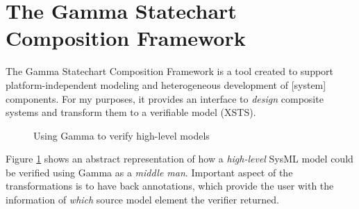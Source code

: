 \section{The Gamma Statechart Composition Framework}

The Gamma Statechart Composition Framework is a tool created to support platform-independent modeling and heterogeneous development of [system] components. For my purposes, it provides an interface to \emph{design} composite systems and transform them to a verifiable model (XSTS).


\begin{figure}[!ht]
	\centering
	
	\caption{Using Gamma to verify high-level models}
	\label{fig:gamma-pipeline}
\end{figure}

Figure \ref{fig:gamma-pipeline} shows an abstract representation of how a \emph{high-level} SysML model could be verified using Gamma as a \emph{middle man}. Important aspect of the transformations is to have back annotations, which provide the user with the information of \emph{which} source model element the verifier returned.
